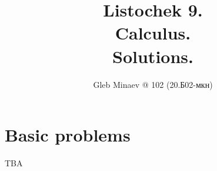 \documentclass[12pt,a4paper]{article}
\title{Listochek 9.\\Calculus.\\Solutions.}
\author{Gleb Minaev @ 102 (20.Б02-мкн)}
\begin{document}
    \maketitle

    \begin{multicols}{2}
        \tableofcontents
    \end{multicols}

    \section*{Basic problems}

    \begin{enumproblem} TBA




    \end{enumproblem}
\end{document}
